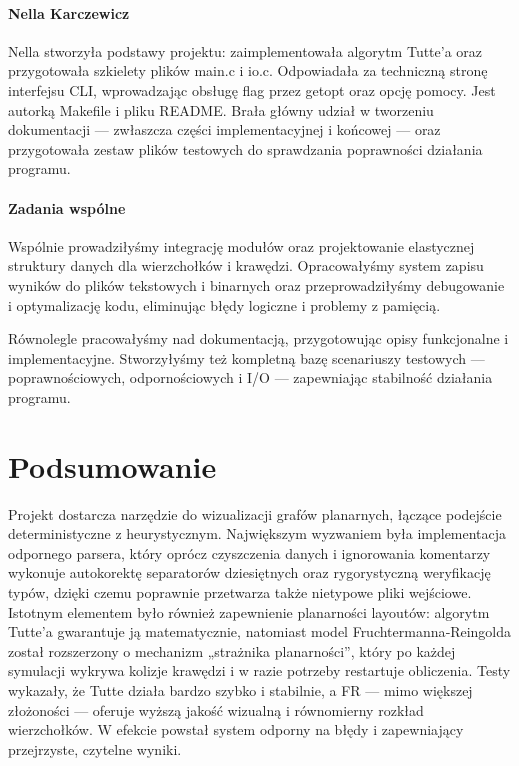 \documentclass[12pt,a4paper]{article}
\begin{document}
\paragraph{Nella Karczewicz}
Nella stworzyła podstawy projektu: zaimplementowała algorytm Tutte’a oraz przygotowała szkielety plików main.c i io.c. Odpowiadała za techniczną stronę interfejsu CLI, wprowadzając obsługę flag przez getopt oraz opcję pomocy. Jest autorką Makefile i pliku README. Brała główny udział w tworzeniu dokumentacji — zwłaszcza części implementacyjnej i końcowej — oraz przygotowała zestaw plików testowych do sprawdzania poprawności działania programu.

\paragraph{Zadania wspólne}
Wspólnie prowadziłyśmy integrację modułów oraz projektowanie elastycznej struktury danych dla wierzchołków i krawędzi. Opracowałyśmy system zapisu wyników do plików tekstowych i binarnych oraz przeprowadziłyśmy debugowanie i optymalizację kodu, eliminując błędy logiczne i problemy z pamięcią.

Równolegle pracowałyśmy nad dokumentacją, przygotowując opisy funkcjonalne i implementacyjne. Stworzyłyśmy też kompletną bazę scenariuszy testowych — poprawnościowych, odpornościowych i I/O — zapewniając stabilność działania programu.

\section{Podsumowanie}
Projekt dostarcza narzędzie do wizualizacji grafów planarnych, łączące podejście deterministyczne z heurystycznym. Największym wyzwaniem była implementacja odpornego parsera, który oprócz czyszczenia danych i ignorowania komentarzy wykonuje autokorektę separatorów dziesiętnych oraz rygorystyczną weryfikację typów, dzięki czemu poprawnie przetwarza także nietypowe pliki wejściowe. Istotnym elementem było również zapewnienie planarności layoutów: algorytm Tutte’a gwarantuje ją matematycznie, natomiast model Fruchtermanna‑Reingolda został rozszerzony o mechanizm „strażnika planarności”, który po każdej symulacji wykrywa kolizje krawędzi i w razie potrzeby restartuje obliczenia. Testy wykazały, że Tutte działa bardzo szybko i stabilnie, a FR — mimo większej złożoności — oferuje wyższą jakość wizualną i równomierny rozkład wierzchołków. W efekcie powstał system odporny na błędy i zapewniający przejrzyste, czytelne wyniki.
\end{document}

